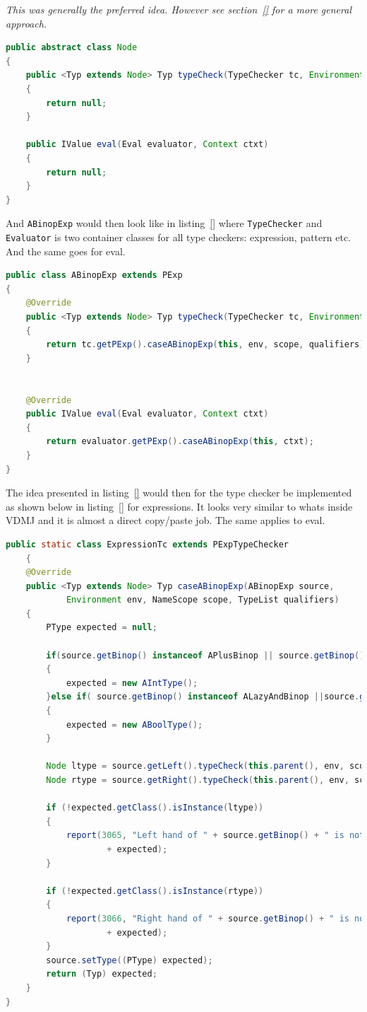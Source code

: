 \documentclass{overturerep}
\begin{document}
\textit{This was generally the preferred idea. However see section~\ref{} for a more general approach.}

\begin{lstlisting}[language=java]
public abstract class Node
{
	public <Typ extends Node> Typ typeCheck(TypeChecker tc, Environment env, NameScope scope, TypeList qualifiers)
	{
		return null;
	}

	public IValue eval(Eval evaluator, Context ctxt)
	{
		return null;
	}
}
\end{lstlisting}

And \texttt{ABinopExp} would then look like in listing~\ref{} where \texttt{TypeChecker} and \texttt{Evaluator} is two container classes for all type checkers: expression, pattern etc. And the same goes for eval.
\begin{lstlisting}[language=java]
public class ABinopExp extends PExp
{
	@Override
	public <Typ extends Node> Typ typeCheck(TypeChecker tc, Environment env, NameScope scope, TypeList  qualifiers)
	{
		return tc.getPExp().caseABinopExp(this, env, scope, qualifiers);
	}


	@Override
	public IValue eval(Eval evaluator, Context ctxt)
	{
		return evaluator.getPExp().caseABinopExp(this, ctxt);
	}
}
\end{lstlisting}

The idea presented in listing~\ref{} would then for the type checker be implemented as shown below in listing~\ref{} for expressions. It looks very similar to whats inside VDMJ and it is almost a direct copy/paste job. The same applies to eval.

\begin{lstlisting}[language=java]
public static class ExpressionTc extends PExpTypeChecker
	{
	@Override
	public <Typ extends Node> Typ caseABinopExp(ABinopExp source,
			Environment env, NameScope scope, TypeList qualifiers)
	{
		PType expected = null;
		
		if(source.getBinop() instanceof APlusBinop || source.getBinop() instanceof AMinusBinop)
		{
			expected = new AIntType();
		}else if( source.getBinop() instanceof ALazyAndBinop ||source.getBinop() instanceof ALazyOrBinop)
		{
			expected = new ABoolType();
		}
		
		Node ltype = source.getLeft().typeCheck(this.parent(), env, scope, null);
		Node rtype = source.getRight().typeCheck(this.parent(), env, scope, null);

		if (!expected.getClass().isInstance(ltype))
		{
			report(3065, "Left hand of " + source.getBinop() + " is not "
					+ expected);
		}

		if (!expected.getClass().isInstance(rtype))
		{
			report(3066, "Right hand of " + source.getBinop() + " is not "
					+ expected);
		}
		source.setType((PType) expected);
		return (Typ) expected;
	}
}
\end{lstlisting}
\end{document}
